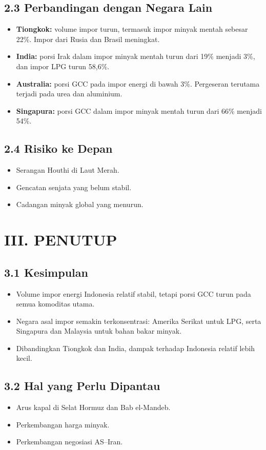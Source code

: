 \documentclass[
  manuscript=article,
  layout=brief,
  year=2026,
  volume=1,
]{den}
\providecommand{\tightlist}{%
  \setlength{\itemsep}{0pt}\setlength{\parskip}{0pt}}
\begin{document}
\subsection{2.3 Perbandingan dengan Negara
Lain}\label{perbandingan-dengan-negara-lain}

\begin{itemize}
\tightlist
\item
  \textbf{Tiongkok:} volume impor turun, termasuk impor minyak mentah
  sebesar 22\%. Impor dari Rusia dan Brasil meningkat.
\item
  \textbf{India:} porsi Irak dalam impor minyak mentah turun dari 19\%
  menjadi 3\%, dan impor LPG turun 58,6\%.
\item
  \textbf{Australia:} porsi GCC pada impor energi di bawah 3\%.
  Pergeseran terutama terjadi pada urea dan aluminium.
\item
  \textbf{Singapura:} porsi GCC dalam impor minyak mentah turun dari
  66\% menjadi 54\%.
\end{itemize}

\subsection{2.4 Risiko ke Depan}\label{risiko-ke-depan}

\begin{itemize}
\tightlist
\item
  Serangan Houthi di Laut Merah.
\item
  Gencatan senjata yang belum stabil.
\item
  Cadangan minyak global yang menurun.
\end{itemize}

\section{III. PENUTUP}\label{iii.-penutup}

\subsection{3.1 Kesimpulan}\label{kesimpulan}

\begin{itemize}
\tightlist
\item
  Volume impor energi Indonesia relatif stabil, tetapi porsi GCC turun
  pada semua komoditas utama.
\item
  Negara asal impor semakin terkonsentrasi: Amerika Serikat untuk LPG,
  serta Singapura dan Malaysia untuk bahan bakar minyak.
\item
  Dibandingkan Tiongkok dan India, dampak terhadap Indonesia relatif
  lebih kecil.
\end{itemize}

\subsection{3.2 Hal yang Perlu Dipantau}\label{hal-yang-perlu-dipantau}

\begin{itemize}
\tightlist
\item
  Arus kapal di Selat Hormuz dan Bab el-Mandeb.
\item
  Perkembangan harga minyak.
\item
  Perkembangan negosiasi AS--Iran.
\end{itemize}
\end{document}
